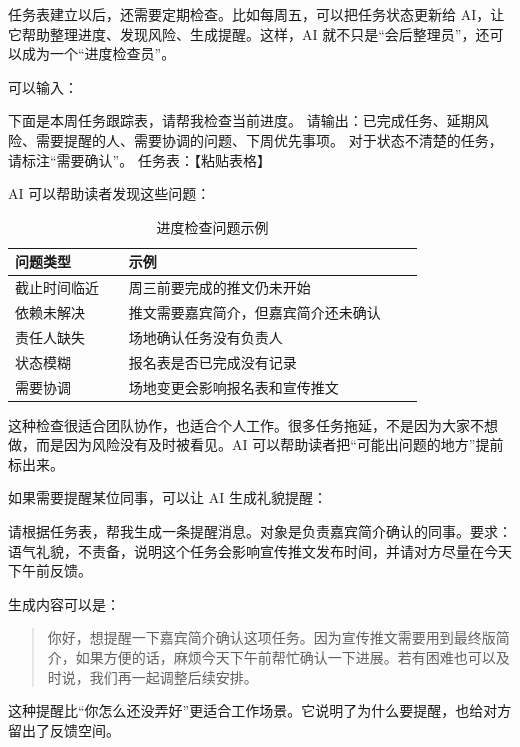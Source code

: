 任务表建立以后，还需要定期检查。比如每周五，可以把任务状态更新给 AI，让它帮助整理进度、发现风险、生成提醒。这样，AI 就不只是“会后整理员”，还可以成为一个“进度检查员”。

可以输入：

\begin{tcolorbox}[promptbox]
下面是本周任务跟踪表，请帮我检查当前进度。
请输出：已完成任务、延期风险、需要提醒的人、需要协调的问题、下周优先事项。
对于状态不清楚的任务，请标注“需要确认”。
任务表：【粘贴表格】
\end{tcolorbox}

AI 可以帮助读者发现这些问题：

\begin{table}[H]
\centering
\caption{进度检查问题示例}
\label{tab:progress-check-issues}
\begin{tabular}{p{0.25\linewidth} p{0.65\linewidth}}
\toprule
\textbf{问题类型} & \textbf{示例} \\
\midrule
截止时间临近 & 周三前要完成的推文仍未开始 \\
依赖未解决 & 推文需要嘉宾简介，但嘉宾简介还未确认 \\
责任人缺失 & 场地确认任务没有负责人 \\
状态模糊 & 报名表是否已完成没有记录 \\
需要协调 & 场地变更会影响报名表和宣传推文 \\
\bottomrule
\end{tabular}
\end{table}

这种检查很适合团队协作，也适合个人工作。很多任务拖延，不是因为大家不想做，而是因为风险没有及时被看见。AI 可以帮助读者把“可能出问题的地方”提前标出来。

如果需要提醒某位同事，可以让 AI 生成礼貌提醒：

\begin{tcolorbox}[promptbox]
请根据任务表，帮我生成一条提醒消息。对象是负责嘉宾简介确认的同事。要求：语气礼貌，不责备，说明这个任务会影响宣传推文发布时间，并请对方尽量在今天下午前反馈。
\end{tcolorbox}

生成内容可以是：

\begin{quote}
你好，想提醒一下嘉宾简介确认这项任务。因为宣传推文需要用到最终版简介，如果方便的话，麻烦今天下午前帮忙确认一下进展。若有困难也可以及时说，我们再一起调整后续安排。
\end{quote}

这种提醒比“你怎么还没弄好”更适合工作场景。它说明了为什么要提醒，也给对方留出了反馈空间。

